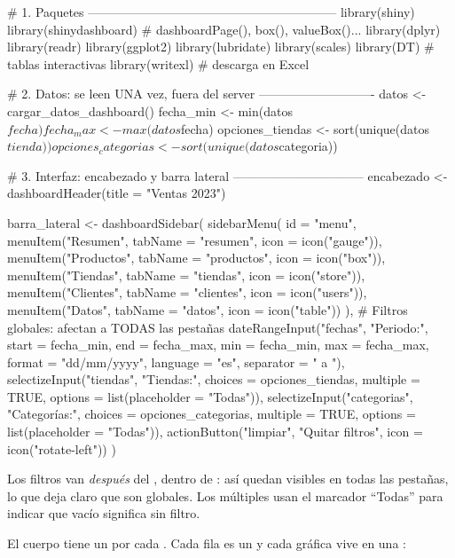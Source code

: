 \begin{rnoejecutar}[title={app.R (partes 1 a 3)}]
# 1. Paquetes ------------------------------------------------------------
library(shiny)
library(shinydashboard)   # dashboardPage(), box(), valueBox()...
library(dplyr)
library(readr)
library(ggplot2)
library(lubridate)
library(scales)
library(DT)               # tablas interactivas
library(writexl)          # descarga en Excel

# 2. Datos: se leen UNA vez, fuera del server ----------------------------
datos <- cargar_datos_dashboard()
fecha_min <- min(datos$fecha)
fecha_max <- max(datos$fecha)
opciones_tiendas    <- sort(unique(datos$tienda))
opciones_categorias <- sort(unique(datos$categoria))

# 3. Interfaz: encabezado y barra lateral --------------------------------
encabezado <- dashboardHeader(title = "Ventas 2023")

barra_lateral <- dashboardSidebar(
  sidebarMenu(
    id = "menu",
    menuItem("Resumen",   tabName = "resumen",   icon = icon("gauge")),
    menuItem("Productos", tabName = "productos", icon = icon("box")),
    menuItem("Tiendas",   tabName = "tiendas",   icon = icon("store")),
    menuItem("Clientes",  tabName = "clientes",  icon = icon("users")),
    menuItem("Datos",     tabName = "datos",     icon = icon("table"))
  ),
  # Filtros globales: afectan a TODAS las pestañas
  dateRangeInput("fechas", "Periodo:", start = fecha_min, end = fecha_max,
                 min = fecha_min, max = fecha_max, format = "dd/mm/yyyy",
                 language = "es", separator = " a "),
  selectizeInput("tiendas", "Tiendas:", choices = opciones_tiendas,
                 multiple = TRUE, options = list(placeholder = "Todas")),
  selectizeInput("categorias", "Categorías:",
                 choices = opciones_categorias, multiple = TRUE,
                 options = list(placeholder = "Todas")),
  actionButton("limpiar", "Quitar filtros", icon = icon("rotate-left"))
)
\end{rnoejecutar}

Los filtros van \emph{después} del , dentro de
: así quedan visibles en todas las pestañas, lo
que deja claro que son globales. Los  múltiples
usan el marcador ``Todas'' para indicar que vacío significa sin filtro.

El cuerpo tiene un  por cada . Cada
fila es un  y cada gráfica vive en una :


